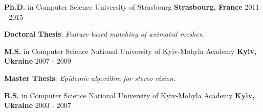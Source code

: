 

\begin{cventries}

  \cventry
    {\textbf{Ph.D.} in Computer Science} %
    {University of Strasbourg} %
    {\textbf{Strasbourg, France}} %
    {2011 - 2015} %
    {
      \begin{cvitems} %
        \item {\textbf{Doctoral Thesis}: \textit{Feature-based matching of animated meshes.}}
      \end{cvitems}
    }
    
  \cventry
    {\textbf{M.S.} in Computer Science} %
    {National University of Kyiv-Mohyla Academy} %
    {\textbf{Kyiv, Ukraine}} %
    {2007 - 2009} %
	{      
	  \begin{cvitems} %
        \item {\textbf{Master Thesis}: \textit{Epidemic algorithm for stereo vision.}}
      \end{cvitems}}
	
 \cventry
   {\textbf{B.S.} in Computer Science} %
   {National University of Kyiv-Mohyla Academy} %
   {\textbf{Kyiv, Ukraine}} %
   {2003 - 2007} %
   {}

\end{cventries}